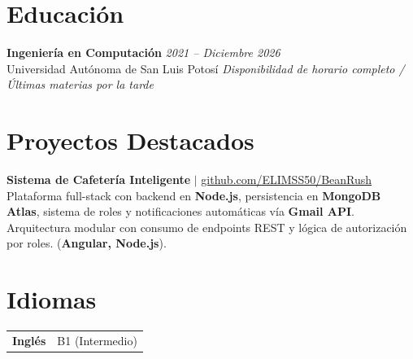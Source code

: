 \documentclass[10pt,a4paper]{article}
\begin{document}
\section{Educación}
\noindent\textbf{Ingeniería en Computación} \hfill \textit{2021 -- Diciembre 2026} \\
Universidad Autónoma de San Luis Potosí \hfill \textit{Disponibilidad de horario completo / Últimas materias por la tarde} \\[0.05em]

\section{Proyectos Destacados}

\noindent\textbf{Sistema de Cafetería Inteligente} $|$ \href{https://github.com/ELIMSS50/BeanRush}{github.com/ELIMSS50/BeanRush} \\
Plataforma full-stack con backend en \textbf{Node.js}, persistencia en \textbf{MongoDB Atlas}, sistema de roles y notificaciones automáticas vía \textbf{Gmail API}. Arquitectura modular con consumo de endpoints REST y lógica de autorización por roles. (\textbf{Angular, Node.js}).

\section{Idiomas}
\begin{tabularx}{\textwidth}{@{}l>{\raggedright\arraybackslash}X@{}}
  \textbf{Inglés}  & B1 (Intermedio) \\
\end{tabularx}
\end{document}
